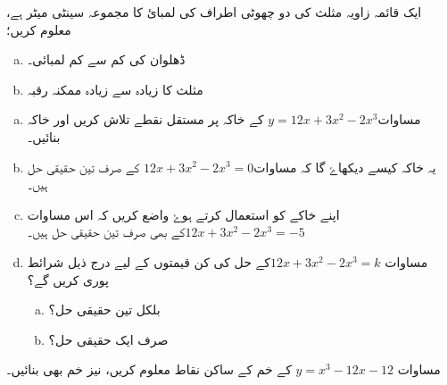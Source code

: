 ایک قائمہ زاویہ مثلث کی دو چھوٹی اطراف کی لمبائ کا  مجموعہ   سینٹی میٹر ہے، معلوم کریں؛
\begin{enumerate}[a.]
\item
ڈھلوان کی کم سے کم لمبائی۔
\item
مثلث کا زیادہ سے زیادہ ممکنہ رقبہ
\end{enumerate}

\begin{enumerate}[a.]
\item
مساوات\( y=12x+3x^2-2x^3 \) کے خاکہ پر مستقل نقطے تلاش کریں اور خاکہ بنائیں۔
\item 
یہ خاکہ کیسے دیکھاۓ گا کہ مساوات\(12x+3x^2-2x^3 =0\) کے صرف تین  حقیقی حل ہیں۔
\item
اپنے خاکے کو استعمال کرتے ہوۓ واضع کریں کہ اس مساوات\( 12x+3x^2-2x^3=-5 \)کے بھی صرف تین حقیقی حل ہیں۔
\item
مساوات \( 12x+3x^2-2x^3=k\)کے حل   کی کن قیمتوں کے لیے درج ذیل شرائط پوری کریں گے؟
\begin{enumerate}[a.]
\item
بلکل تین حقیقی حل؟
\item
صرف ایک  حقیقی حل؟
\end{enumerate}
\end{enumerate}
مساوات \( y=x^3-12x-12 \) کے خم کے ساکن نقاط معلوم کریں، نیز خم بھی بنائیں۔

